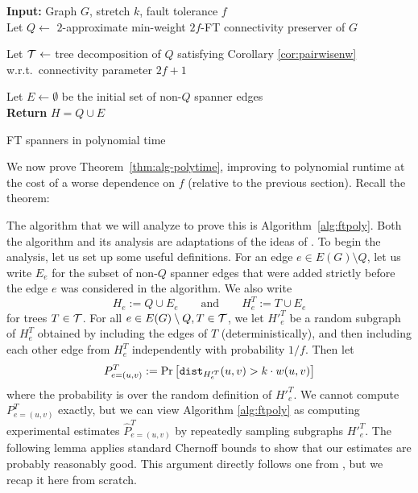 \begin{algorithm}[t]
\DontPrintSemicolon

\textbf{Input:} Graph $G$, stretch $k$, fault tolerance $f$\;~\\

Let $Q \gets $ $2$-approximate min-weight $2f$-FT connectivity preserver of $G$ 

Let $\mathcal{T} \gets$ tree decomposition of $Q$ satisfying Corollary \ref{cor:pairwisenw} w.r.t.\ connectivity parameter $2f+1$\;

Let $E \gets \emptyset$ be the initial set of non-$Q$ spanner edges\;~\\

\textbf{Return} $H = Q \cup E$\;
\caption{\label{alg:ftpoly} FT spanners in polynomial time}
\end{algorithm}

We now prove Theorem~\ref{thm:alg-polytime}, improving to polynomial runtime at the cost of a worse dependence on $f$ (relative to the previous section).  Recall the theorem:

\algpolytime*

The algorithm that we will analyze to prove this is Algorithm~\ref{alg:ftpoly}.  Both the algorithm and its analysis are adaptations of the ideas of \cite{BDR21}.
To begin the analysis, let us set up some useful definitions.
For an edge $e \in E(G) \setminus Q$, let us write $E_e$ for the subset of non-$Q$ spanner edges that were added strictly before the edge $e$ was considered in the algorithm.
We also write
$$H_e := Q \cup E_e \qquad \text{and} \qquad H_e^T := T \cup E_e$$
for trees $T \in \mathcal{T}$.
For all $e \in E(G) \setminus Q, T \in \mathcal{T}$, we let $H'^T_e$ be a random subgraph of $H_e^T$ obtained by including the edges of $T$ (deterministically), and then including each other edge from $H_e^T$ independently with probability $1/f$.
Then let
$$P^T_{e=(u, v)} := \Pr\left[ \texttt{dist}_{H'^T_e}(u, v) > k \cdot w(u, v) \right]$$
where the probability is over the random definition of $H'^T_e$.
We cannot compute $P^T_{e=(u, v)}$ exactly, but we can view Algorithm \ref{alg:ftpoly} as computing experimental estimates $\widehat{P}^T_{e=(u, v)}$ by repeatedly sampling subgraphs $H'^T_e$.
The following lemma applies standard Chernoff bounds to show that our estimates are probably reasonably good.
This argument directly follows one from \cite{BDR21}, but we recap it here from scratch.

